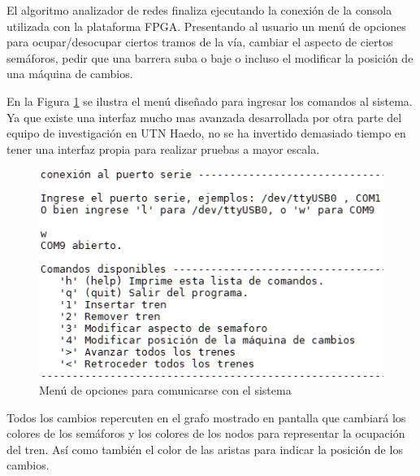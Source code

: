 	El algoritmo analizador de redes finaliza ejecutando la conexión de la consola utilizada con la plataforma FPGA. Presentando al usuario un menú de opciones para ocupar/desocupar ciertos tramos de la vía, cambiar el aspecto de ciertos semáforos, pedir que una barrera suba o baje o incluso el modificar la posición de una máquina de cambios.
	
	En la Figura \ref{fig:Menu_UART} se ilustra el menú diseñado para ingresar los comandos al sistema. Ya que existe una interfaz mucho mas avanzada desarrollada por otra parte del equipo de investigación en UTN Haedo, no se ha invertido demasiado tiempo en tener una interfaz propia para realizar pruebas a mayor escala.
	
		\begin{figure}[h]
		\centering
		\includegraphics[scale=.76]{./Figures/Test/UART_2}
			\caption{Menú de opciones para comunicarse con el sistema}
			\label{fig:Menu_UART}
		\end{figure}
	
	Todos los cambios repercuten en el grafo mostrado en pantalla que cambiará los colores de los semáforos y los colores de los nodos para representar la ocupación del tren. Así como también el color de las aristas para indicar la posición de los cambios.
